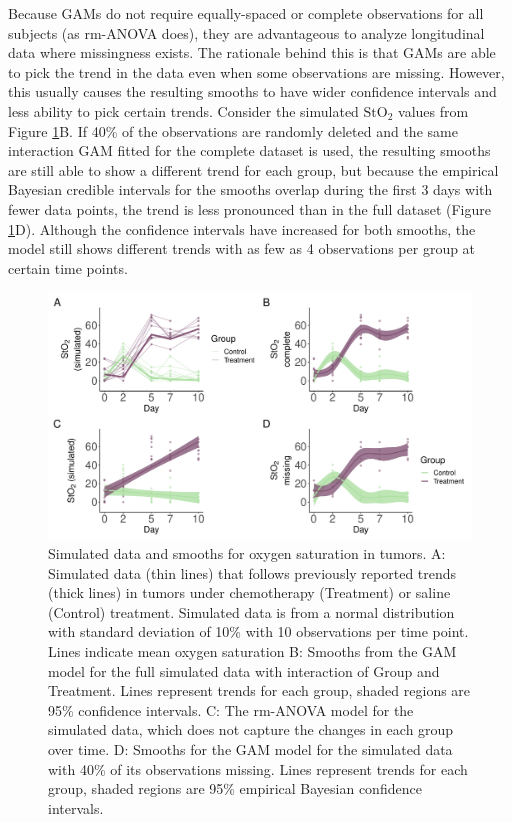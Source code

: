 \documentclass[
]{article}
\begin{document}
Because GAMs do not require equally-spaced or complete observations for all subjects (as rm-ANOVA does), they are advantageous to analyze longitudinal data where missingness exists. The rationale behind this is that GAMs are able to pick the trend in the data even when some observations are missing. However, this usually causes the resulting smooths to have wider confidence intervals and less ability to pick certain trends. Consider the simulated \(\mbox{StO}_2\) values from Figure \ref{fig:sim-smooth-plot}B. If 40\% of the observations are randomly deleted and the same interaction GAM fitted for the complete dataset is used, the resulting smooths are still able to show a different trend for each group, but because the empirical Bayesian credible intervals for the smooths overlap during the first 3 days with fewer data points, the trend is less pronounced than in the full dataset (Figure \ref{fig:sim-smooth-plot}D). Although the confidence intervals have increased for both smooths, the model still shows different trends with as few as 4 observations per group at certain time points.



\begin{figure}

{\centering \includegraphics[width=1\linewidth]{SIM_Appendix_files/figure-latex/sim-smooth-plot-1} 

}

\caption{Simulated data and smooths for oxygen saturation in tumors. A: Simulated data (thin lines) that follows previously reported trends (thick lines) in tumors under chemotherapy (Treatment) or saline (Control) treatment. Simulated data is from a normal distribution with standard deviation of 10\% with 10 observations per time point. Lines indicate mean oxygen saturation B: Smooths from the GAM model for the full simulated data with interaction of Group and Treatment. Lines represent trends for each group, shaded regions are 95\% confidence intervals. C: The rm-ANOVA model for the simulated data, which does not capture the changes in each group over time. D: Smooths for the GAM model for the simulated data with 40\% of its observations missing. Lines represent trends for each group, shaded regions are 95\% empirical Bayesian confidence intervals.}\label{fig:sim-smooth-plot}
\end{figure}
\end{document}
